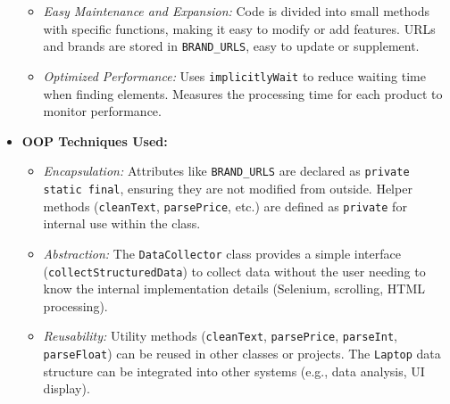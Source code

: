 \documentclass{article}
\begin{document}
\begin{itemize}
\begin{itemize}
        \item \textit{Easy Maintenance and Expansion:} Code is divided into small methods with specific functions, making it easy to modify or add features. URLs and brands are stored in \texttt{BRAND\_URLS}, easy to update or supplement.
        \item \textit{Optimized Performance:} Uses \texttt{implicitlyWait} to reduce waiting time when finding elements. Measures the processing time for each product to monitor performance.
    \end{itemize}
    \item \textbf{OOP Techniques Used:}
    \begin{itemize}
        \item \textit{Encapsulation:} Attributes like \texttt{BRAND\_URLS} are declared as \texttt{private static final}, ensuring they are not modified from outside. Helper methods (\texttt{cleanText}, \texttt{parsePrice}, etc.) are defined as \texttt{private} for internal use within the class.
        \item \textit{Abstraction:} The \texttt{DataCollector} class provides a simple interface (\texttt{collectStructuredData}) to collect data without the user needing to know the internal implementation details (Selenium, scrolling, HTML processing).
        \item \textit{Reusability:} Utility methods (\texttt{cleanText}, \texttt{parsePrice}, \texttt{parseInt}, \texttt{parseFloat}) can be reused in other classes or projects. The \texttt{Laptop} data structure can be integrated into other systems (e.g., data analysis, UI display).
    \end{itemize}
\end{itemize}
\end{document}
